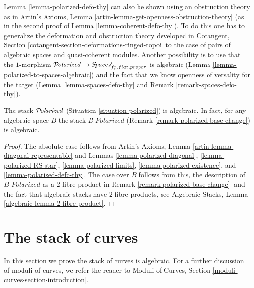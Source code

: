 \begin{remark}
\label{remark-polarized-defo-thy}
Lemma \ref{lemma-polarized-defo-thy} can also be shown
using an obstruction theory as in
Artin's Axioms, Lemma \ref{artin-lemma-get-openness-obstruction-theory}
(as in the second proof of Lemma \ref{lemma-coherent-defo-thy}).
To do this one has to generalize the deformation and obstruction theory
developed in
Cotangent, Section \ref{cotangent-section-deformations-ringed-topoi}
to the case of pairs of algebraic spaces and quasi-coherent modules.
Another possibility is to use that the $1$-morphism
$\mathcal{P}\!\mathit{olarized} \to \mathcal{S}\!\mathit{paces}'_{fp, flat, proper}$
is algebraic (Lemma \ref{lemma-polarized-to-spaces-algebraic})
and the fact that we know openness of versality for the target
(Lemma \ref{lemma-spaces-defo-thy} and
Remark \ref{remark-spaces-defo-thy}).
\end{remark}

\begin{theorem}
\label{theorem-polarized-algebraic}
The stack $\mathcal{P}\!\mathit{olarized}$ (Situation \ref{situation-polarized})
is algebraic. In fact, for any algebraic space $B$ the stack
$B\textit{-Polarized}$ (Remark \ref{remark-polarized-base-change})
is algebraic.
\end{theorem}

\begin{proof}
The absolute case follows from
Artin's Axioms, Lemma \ref{artin-lemma-diagonal-representable}
and Lemmas \ref{lemma-polarized-diagonal},
\ref{lemma-polarized-RS-star},
\ref{lemma-polarized-limits},
\ref{lemma-polarized-existence}, and
\ref{lemma-polarized-defo-thy}.
The case over $B$ follows from this, the description of
$B\textit{-Polarized}$ as a $2$-fibre product in
Remark \ref{remark-polarized-base-change}, and the fact
that algebraic stacks have $2$-fibre products, see
Algebraic Stacks, Lemma \ref{algebraic-lemma-2-fibre-product}.
\end{proof}











\section{The stack of curves}
\label{section-curves}

\noindent
In this section we prove the stack of curves is algebraic. For
a further discussion of moduli of curves, we refer the reader
to Moduli of Curves, Section \ref{moduli-curves-section-introduction}.

